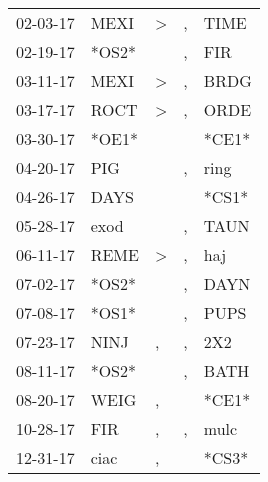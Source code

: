 \begin{supertabular}{p{0.07\textwidth}p{0.06\textwidth}p{0.02\textwidth}p{0.02\textwidth}p{0.06\textwidth}}
          02-03-17\textsuperscript{} &  MEXI\textsuperscript{} &  \textgreater &                , &  TIME\textsuperscript{} \\
          02-19-17\textsuperscript{} &                   *OS2* &               &                , &   FIR\textsuperscript{} \\
          03-11-17\textsuperscript{} &  MEXI\textsuperscript{} &  \textgreater &                , &  BRDG\textsuperscript{} \\
          03-17-17\textsuperscript{} &  ROCT\textsuperscript{} &  \textgreater &                , &  ORDE\textsuperscript{} \\
          03-30-17\textsuperscript{} &                   *OE1* &               &                  &                   *CE1* \\
          04-20-17\textsuperscript{} &   PIG\textsuperscript{} &               &                , &  ring\textsuperscript{} \\
          04-26-17\textsuperscript{} &  DAYS\textsuperscript{} &               &                  &                   *CS1* \\
          05-28-17\textsuperscript{} &  exod\textsuperscript{} &               &                , &  TAUN\textsuperscript{} \\
          06-11-17\textsuperscript{} &  REME\textsuperscript{} &  \textgreater &                , &   haj\textsuperscript{} \\
          07-02-17\textsuperscript{} &                   *OS2* &               &                , &  DAYN\textsuperscript{} \\
          07-08-17\textsuperscript{} &                   *OS1* &               &                , &  PUPS\textsuperscript{} \\
          07-23-17\textsuperscript{} &  NINJ\textsuperscript{} &             , &                , &   2X2\textsuperscript{} \\
          08-11-17\textsuperscript{} &                   *OS2* &               &                , &  BATH\textsuperscript{} \\
          08-20-17\textsuperscript{} &  WEIG\textsuperscript{} &             , &                  &                   *CE1* \\
          10-28-17\textsuperscript{} &   FIR\textsuperscript{} &             , &                , &  mulc\textsuperscript{} \\
          12-31-17\textsuperscript{} &  ciac\textsuperscript{} &             , &                  &                   *CS3* \\

\end{supertabular}
